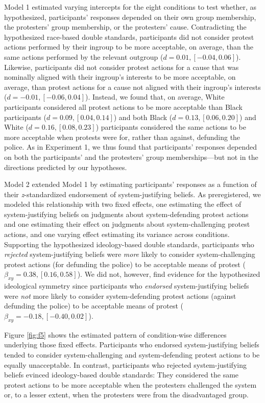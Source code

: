 \documentclass[12pt, letterpaper]{article}
\begin{document}
Model 1 estimated varying intercepts for the eight conditions to test
whether, as hypothesized, participants' responses depended on their own
group membership, the protesters' group membership, or the protesters'
cause. Contradicting the hypothesized race-based double standards,
participants did not consider protest actions performed by their ingroup
to be more acceptable, on average, than the same actions performed by
the relevant outgroup (\(d = 0.01, [-0.04, 0.06]\)). Likewise,
participants did not consider protest actions for a cause that was
nominally aligned with their ingroup's interests to be more acceptable,
on average, than protest actions for a cause not aligned with their
ingroup's interests (\(d = -0.01, [-0.06, 0.04]\)). Instead, we found
that, on average, White participants considered all protest actions to
be more acceptable than Black participants (\(d = 0.09, [0.04, 0.14]\))
and both Black (\(d = 0.13, [0.06, 0.20]\)) and White
(\(d = 0.16, [0.08, 0.23]\)) participants considered the same actions to
be more acceptable when protests were for, rather than against,
defunding the police. As in Experiment 1, we thus found that
participants' responses depended on both the participants' and the
protesters' group memberships---but not in the directions predicted by
our hypotheses.

Model 2 extended Model 1 by estimating participants' responses as a
function of their \emph{z}-standardized endorsement of system-justifying
beliefs. As preregistered, we modeled this relationship with two fixed
effects, one estimating the effect of system-justifying beliefs on
judgments about system-defending protest actions and one estimating
their effect on judgments about system-challenging protest actions, and
one varying effect estimating its variance across conditions. Supporting
the hypothesized ideology-based double standards, participants who
\emph{rejected} system-justifying beliefs were \emph{more} likely to
consider system-challenging protest actions (for defunding the police)
to be acceptable means of protest (\(\beta_{xy} = 0.38, [0.16, 0.58]\)).
We did not, however, find evidence for the hypothesized ideological
symmetry since participants who \emph{endorsed} system-justifying
beliefs were \emph{not} more likely to consider system-defending protest
actions (against defunding the police) to be acceptable means of protest
(\(\beta_{xy} = -0.18, [-0.40, 0.02]\)).

Figure \ref{fig:f5} shows the estimated pattern of condition-wise
differences underlying those fixed effects. Participants who endorsed
system-justifying beliefs tended to consider system-challenging and
system-defending protest actions to be equally unacceptable. In
contrast, participants who rejected system-justifying beliefs evinced
ideology-based double standards: They considered the same protest
actions to be more acceptable when the protesters challenged the system
or, to a lesser extent, when the protesters were from the disadvantaged
group.
\end{document}
